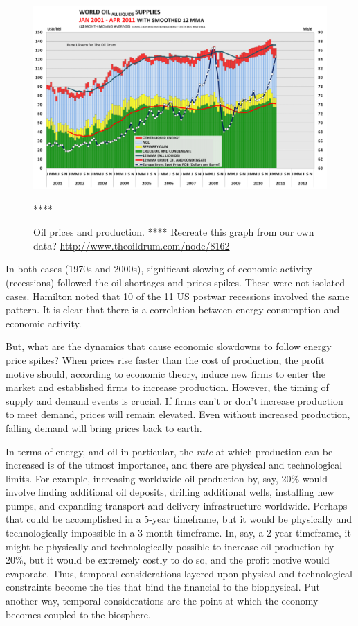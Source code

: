 \begin{figure}[!ht]
\centering\
\includegraphics[width=\linewidth]{Part_0/Chapter_Introduction/images/Oil_Prices.pdf}
\caption[Oil prices and production]{Oil prices and production.
**** Recreate this graph from our own data? \url{http://www.theoildrum.com/node/8162}} ****
\label{fig:oils_prices_and_production}
\end{figure}

In both cases (1970s and 2000s), 
significant slowing of economic activity (recessions)
followed the oil shortages and prices spikes.
These were not isolated cases.
Hamilton noted that 
10 of the 11 US postwar recessions 
involved the same pattern.\cite[p.~45]{Hamilton:2013vc}
It is clear that 
there is a correlation between energy consumption and economic activity.

But, what are the dynamics that cause economic slowdowns 
to follow energy price spikes?
When prices rise faster than the cost of production, 
the profit motive should, according to economic theory, induce 
new firms to enter the market and
established firms to increase production.
However, the timing of supply and demand events is crucial.
If firms can't or don't increase production to meet demand, 
prices will remain elevated.
Even without increased production, falling demand will 
bring prices back to earth.

In terms of energy, and oil in particular, 
the \emph{rate} at which production can be increased 
is of the utmost importance, and
there are physical and technological limits. 
For example, increasing worldwide oil production by, say, 20\% would involve
finding additional oil deposits, drilling additional wells, installing new pumps,
and expanding transport and delivery infrastructure worldwide.
Perhaps that could be accomplished in a 5-year timeframe, 
but it would be physically and technologically impossible in a 3-month timeframe.
In, say, a 2-year timeframe, it might be physically and technologically possible
to increase oil production by 20\%, 
but it would be extremely costly to do so,
and the profit motive would evaporate.
Thus, temporal considerations 
layered upon physical and technological constraints 
become the ties that bind the financial to the biophysical.
Put another way, temporal considerations are the point at which the economy 
becomes coupled to the biosphere.

